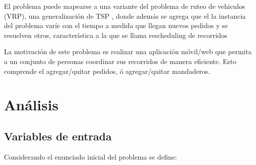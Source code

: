 \documentclass[9pt,conference]{IEEEtran}
\begin{document}
	El problema puede mapearse a una variante del problema de ruteo de vehiculos (VRP), una generalización de TSP \cite{refvrp}, donde además se agrega que el la instancia del problema varíe con el tiempo a medida que llegan nuevos pedidos y se resuelven otros, característica a la que se llama rescheduling de recorridos

	La motivación de este problema es realizar una aplicación móvil/web que permita a un conjunto de personas coordinar sus recorridos de manera eficiente. Esto comprende el agregar/quitar pedidos, ó agregar/quitar mandaderos.

	\section{Análisis}

	\subsection{Variables de entrada}

	Considerando el enunciado inicial del problema se define:
\end{document}
